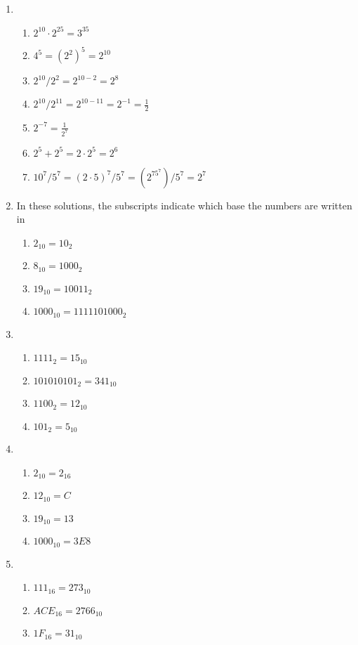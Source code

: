 \documentclass{article}
\begin{document}
\begin{enumerate}
\item 
\begin{enumerate}
\item $2^{10}\cdot 2^{25}=3^{35}$
\item $4^5=\left(2^2\right)^5=2^{10}$
\item $2^{10}/ 2^2=2^{10-2}=2^8$
\item $2^{10}/ 2^{11}=2^{10-11}=2^{-1}=\frac12$
\item $2^{-7}=\frac{1}{2^7}$
\item $2^5+2^5=2\cdot2^5=2^6$
\item $10^7/5^7=(2\cdot5)^7/5^7=\left(2^75^7\right)/5^7=2^7$
\end{enumerate}
\item In these solutions, the subscripts indicate which base the numbers are written in
\begin{enumerate}
\item $2_{10}=10_{2}$
\item $8_{10}=1000_{2}$
\item $19_{10}=10011_{2}$
\item $1000_{10}=1111101000_2$
\end{enumerate}
\item
\begin{enumerate}
\item $1111_2=15_{10}$
\item $101010101_2=341_{10}$
\item $1100_2=12_{10}$
\item $101_2=5_{10}$
\end{enumerate}
\item
\begin{enumerate}
\item $2_{10}=2_{16}$
\item $12_{10}=C$
\item $19_{10}=13$
\item $1000_{10}=3E8$
\end{enumerate}
\item 
\begin{enumerate}
\item $111_{16}=273_{10}$
\item $ACE_{16}=2766_{10}$
\item $1F_{16}=31_{10}$
\end{enumerate}
\end{enumerate}
\end{document}
